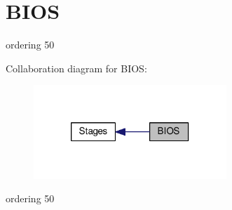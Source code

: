 \hypertarget{group__BIOS}{\section{B\-I\-O\-S}
\label{group__BIOS}
}


ordering 50  


Collaboration diagram for B\-I\-O\-S\-:
\nopagebreak
\begin{figure}[H]
\begin{center}
\leavevmode
\includegraphics[width=206pt]{group__BIOS}
\end{center}
\end{figure}
ordering 50 